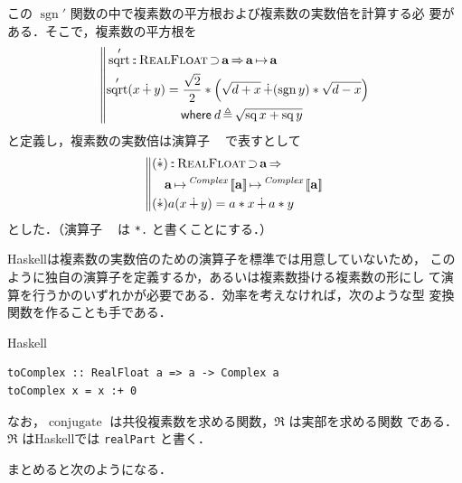 \documentclass[a5paper,twoside,fleqn]{jsbook}
\def\[{\left[\!\left[}
\def\]{\right]\!\right]}
\DeclareMathOperator{\sgn}{sgn}
\newcommand{\programminglanguage}[1]{\textsf{#1}}
\newcommand{\haskell}{\programminglanguage{Haskell}}
\newcommand{\code}[1]{\texttt{#1}}
\newenvironment{haskellcode}{\begin{itembox}[r]{\haskell}}{\end{itembox}}
\newcommand{\mBrace}{\Vert}
\newcommand{\mKeyword}[1]{\mathsf{#1}} %
\newcommand{\mWhereKeyword}{\mKeyword{where}}
\DeclareMathOperator{\mSuperClass}{\Rightarrow}
\DeclareMathOperator{\mSuperSet}{\supset}
\newcommand{\mSpecialFunc}[1]{\mathrm{#1}}
\DeclareMathOperator{\mConjugate}{\mSpecialFunc{conjugate}}
\DeclareMathOperator{\mSq}{\mSpecialFunc{sq}}
\DeclareMathOperator{\mSqrtFunc}{\mSpecialFunc{sqrt}}
\DeclareMathOperator{\mComplexPlus}{\dotplus}
\DeclareMathOperator{\mComplexTimes}{\Dot\ast}
\DeclareMathOperator{\mIn}{{:\!:}}
\DeclareMathOperator{\mLetEq}{\triangleq}
\DeclareMathOperator{\mMapsTo}{\mapsto}
\newcommand{\mType}[1]{\mathbf{#1}}
\newcommand{\mGenericTypeAssemble}[2]{{}^{\mTypeConstructor{#1}}\[\mType{#2}\]}
\newcommand{\mComplexType}[1]{\mGenericTypeAssemble{Complex}{#1}}
\newcommand{\mTypeConstructor}[1]{\textit{#1}}
\newcommand{\mGenericTypeClass}[1]{\textsc{#1}} %
\newcommand{\mRealFloatTypeClass}{\mGenericTypeClass{RealFloat}}
\newcommand{\mProj}[2]{#1\mMapsTo#2}
\newcommand{\mWhereIs}[2]{\mathbin{\mWhereKeyword}#1\mLetEq#2}
\begin{document}
この $\sgn'$ 関数の中で複素数の平方根および複素数の実数倍を計算する必
要がある．そこで，複素数の平方根を
\begin{equation}
\left\mBrace
\begin{aligned}
&\mSqrtFunc'\mIn\mRealFloatTypeClass\mSuperSet\mType{a}
\mSuperClass\mProj{\mType{a}}{\mType{a}}\\
&\begin{aligned}
\mSqrtFunc'(x\mComplexPlus y)
&=\frac{\sqrt{2}}{2}*\left(\sqrt{d+x}\mComplexPlus(\sgn y)*\sqrt{d-x}\right)\\
&\quad\mWhereIs{d}{\sqrt{\mSq x+\mSq y}}
\end{aligned}
\end{aligned}
\right.
\end{equation}
と定義し，複素数の実数倍は演算子 $\mComplexTimes$ で表すとして
\begin{equation}
\left\mBrace
\begin{aligned}
&(\mComplexTimes)\mIn\mRealFloatTypeClass\mSuperSet\mType{a}\mSuperClass\\
&\quad\mProj{\mType{a}}{\mProj{\mComplexType{a}}{\mComplexType{a}}}\\
&(\mComplexTimes)a(x\mComplexPlus y)=a*x\mComplexPlus a*y
\end{aligned}
\right.
\end{equation}
とした．（演算子 $\mComplexTimes$ は \code{*.} と書くことにする．）

\haskell は複素数の実数倍のための演算子を標準では用意していないため，
このように独自の演算子を定義するか，あるいは複素数掛ける複素数の形にし
て演算を行うかのいずれかが必要である．効率を考えなければ，次のような型
変換関数を作ることも手である．
\begin{haskellcode}
\begin{verbatim}
toComplex :: RealFloat a => a -> Complex a
toComplex x = x :+ 0
\end{verbatim}
\end{haskellcode}

なお，$\mConjugate$ は共役複素数を求める関数，$\Re$ は実部を求める関数
である．$\Re$ は\haskell では \code{realPart} と書く．

まとめると次のようになる．
\end{document}
